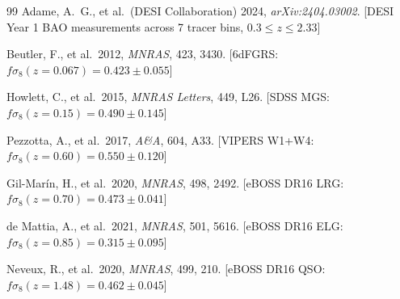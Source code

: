 \documentclass[12pt,a4paper]{article}
\begin{document}
\begin{thebibliography}{99}
Adame, A.~G., et al.\ (DESI Collaboration) 2024,
\textit{arXiv:2404.03002}.
[DESI Year 1 BAO measurements across 7 tracer bins, $0.3\leq z\leq 2.33$]

Beutler, F., et al.\ 2012, \textit{MNRAS}, 423, 3430.
[6dFGRS: $f\sigma_8(z=0.067)=0.423\pm0.055$]

Howlett, C., et al.\ 2015, \textit{MNRAS Letters}, 449, L26.
[SDSS MGS: $f\sigma_8(z=0.15)=0.490\pm0.145$]

Pezzotta, A., et al.\ 2017, \textit{A\&A}, 604, A33.
[VIPERS W1+W4: $f\sigma_8(z=0.60)=0.550\pm0.120$]

Gil-Mar\'in, H., et al.\ 2020, \textit{MNRAS}, 498, 2492.
[eBOSS DR16 LRG: $f\sigma_8(z=0.70)=0.473\pm0.041$]

de Mattia, A., et al.\ 2021, \textit{MNRAS}, 501, 5616.
[eBOSS DR16 ELG: $f\sigma_8(z=0.85)=0.315\pm0.095$]

Neveux, R., et al.\ 2020, \textit{MNRAS}, 499, 210.
[eBOSS DR16 QSO: $f\sigma_8(z=1.48)=0.462\pm0.045$]

\end{thebibliography}
\end{document}
